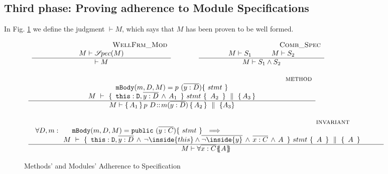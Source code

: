 {\subsection{Third phase: Proving adherence to Module Specifications}
\label{sect:wf}

In Fig. \ref{f:wf} we  define the judgment $\vdash M$, which says that %
$M$ has been proven to be well formed. 



\begin{figure}[thb]
$
\begin{array}{l}
\begin{array}{lcl}
\inferruleSDNarrow 
{~ \strut  {\sc{WellFrm\_Mod}}}
{  M \vdash \SpecOf {M}
}
{
\vdash M  
}
& \hspace{0.7cm} &
\inferruleSDNarrow 
{~ \strut   {\sc{Comb\_Spec}}}
{  
M \vdash S_1 \hspace{1cm}  M \vdash S_2
}
{
M \vdash S_1 \wedge S_2
}
\end{array}
\\
\\
\inferruleSD 
{~ \strut \hspace{6.5cm} {\sc{method}}}
{  
 \prg{mBody}(m,D,M)=p \ (\overline{y:D})\{\  stmt \ \}  %
    \\
  {\hprovesN{M} { \ \prg{this}:\prg{D}, \overline{y:D}\, \wedge\, A_1\  } {\ stmt\ } {\ A_2 \ }   {A_3} } 
}
{
M \vdash {\mprepostN {A_1}{p\ D}{m}{y}{D}{A_2} {A_3} }
}
\\
\\
\inferruleSD 
{~ \strut \hspace{6.5cm} {\sc{invariant}}}
{  
\begin{array}{l}
\forall  D,  m:\ \ \  \ \  \prg{mBody}(m,D,M)=\prg{public} \ (\overline{y:C})\{\  stmt \ \}      \ \ \Longrightarrow  
    \\
   ~ \strut \hspace{0.7cm}  \ \ \ \  \  %
 {\hprovesN{M} { \ \prg{this}:\prg{D}, \overline{y:D}\, \wedge\, \neg\inside{this}\wedge\overline{ \neg\inside{y}}\, \wedge\, \overline{x:C}\, \wedge\,  A\  } {\ stmt\ } {\ A\ } {\ A \ }  }\ \ \ \ \  \ \  
\end{array}
}
{
M \vdash \TwoStatesN{ \overline{x:C}} {A}
}
\end{array}
$
\caption{Methods' and Modules' Adherence to Specification}
\label{f:wf}
\end{figure}

}

